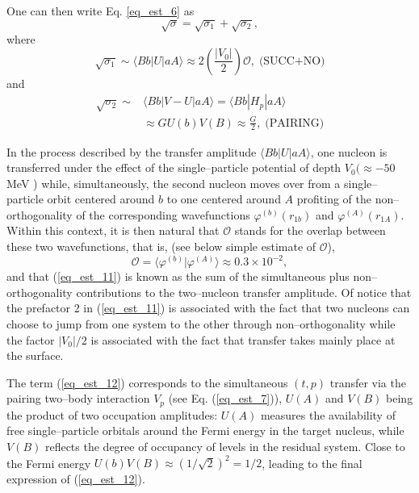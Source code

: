 \documentclass[a4paper,14pt]{article}
\begin{document}
One can then write Eq. \ref{eq_est_6} as
\begin{equation}\label{eq_est_10}
\sqrt{\sigma}=\sqrt{\sigma_1}+\sqrt{\sigma_2},
\end{equation}
where
\begin{equation}\label{eq_est_11}
\sqrt{\sigma_1}\sim \langle Bb | U| aA\rangle \approx 2\left(\frac{|V_0|}{2}\right)\mathcal{O}, \; \text{(SUCC+NO)}
\end{equation}
and
\begin{equation}\label{eq_est_12}
\begin{split}
\sqrt{\sigma_2}\sim & \langle Bb |V-U| aA\rangle = \langle Bb |H_p| aA\rangle\\
&\approx GU(b)V(B)\approx\frac{G}{2}, \; \text{(PAIRING)}
\end{split}
\end{equation}

In the process described by the transfer amplitude $\langle Bb |U| aA\rangle$, one nucleon is transferred under the effect of the single--particle potential of depth $V_0(\approx -50$ MeV ) while, simultaneously, the second nucleon moves over from a single--particle orbit centered around $b$ to one centered around $A$ profiting of the non--orthogonality of the corresponding wavefunctions $\varphi^{(b)}(r_{1b})$ and $\varphi^{(A)}(r_{1A})$. Within this context, it is then natural that $\mathcal{O}$ stands for the overlap between these two  wavefunctions, that is, (see below simple estimate of $\mathcal{O}$),
\begin{equation}\label{eq_est_13}
\mathcal{O}=\langle \varphi^{(b)}|\varphi^{(A)}\rangle \approx 0.3 \times 10^{-2},
\end{equation}
and that (\ref{eq_est_11}) is known as the sum of the simultaneous plus non--orthogonality contributions to the two--nucleon transfer amplitude. Of notice that the prefactor 2 in (\ref{eq_est_11}) is associated with the fact that two nucleons can choose to jump from one system to the other through non--orthogonality while the factor $|V_0|/2$ is associated with the fact that transfer takes mainly place at the surface.


The term (\ref{eq_est_12}) corresponds to the simultaneous $(t,p)$ transfer via the pairing two--body interaction $V_p$ (see Eq. (\ref{eq_est_7})), $U(A)$ and $V(B)$ being the product of two occupation amplitudes: $U(A)$ measures the availability of free single--particle orbitals around the Fermi energy in the target nucleus, while $V(B)$ reflects the degree of occupancy of levels in the residual system. Close to the Fermi energy $U(b)V(B)\approx (1/\sqrt{2})^2=1/2$, leading to the final expression of (\ref{eq_est_12}).
\end{document}

